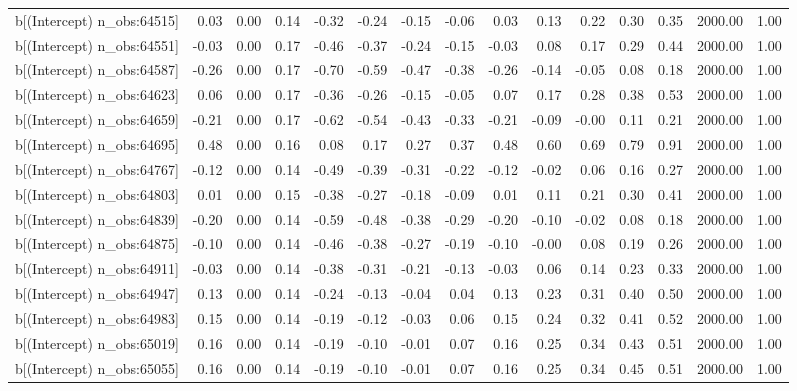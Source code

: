 \begin{table}[ht]
\begin{tabular}{rrrrrrrrrrrrrrr}
  b[(Intercept) n\_obs:64515] & 0.03 & 0.00 & 0.14 & -0.32 & -0.24 & -0.15 & -0.06 & 0.03 & 0.13 & 0.22 & 0.30 & 0.35 & 2000.00 & 1.00 \\ 
  b[(Intercept) n\_obs:64551] & -0.03 & 0.00 & 0.17 & -0.46 & -0.37 & -0.24 & -0.15 & -0.03 & 0.08 & 0.17 & 0.29 & 0.44 & 2000.00 & 1.00 \\ 
  b[(Intercept) n\_obs:64587] & -0.26 & 0.00 & 0.17 & -0.70 & -0.59 & -0.47 & -0.38 & -0.26 & -0.14 & -0.05 & 0.08 & 0.18 & 2000.00 & 1.00 \\ 
  b[(Intercept) n\_obs:64623] & 0.06 & 0.00 & 0.17 & -0.36 & -0.26 & -0.15 & -0.05 & 0.07 & 0.17 & 0.28 & 0.38 & 0.53 & 2000.00 & 1.00 \\ 
  b[(Intercept) n\_obs:64659] & -0.21 & 0.00 & 0.17 & -0.62 & -0.54 & -0.43 & -0.33 & -0.21 & -0.09 & -0.00 & 0.11 & 0.21 & 2000.00 & 1.00 \\ 
  b[(Intercept) n\_obs:64695] & 0.48 & 0.00 & 0.16 & 0.08 & 0.17 & 0.27 & 0.37 & 0.48 & 0.60 & 0.69 & 0.79 & 0.91 & 2000.00 & 1.00 \\ 
  b[(Intercept) n\_obs:64767] & -0.12 & 0.00 & 0.14 & -0.49 & -0.39 & -0.31 & -0.22 & -0.12 & -0.02 & 0.06 & 0.16 & 0.27 & 2000.00 & 1.00 \\ 
  b[(Intercept) n\_obs:64803] & 0.01 & 0.00 & 0.15 & -0.38 & -0.27 & -0.18 & -0.09 & 0.01 & 0.11 & 0.21 & 0.30 & 0.41 & 2000.00 & 1.00 \\ 
  b[(Intercept) n\_obs:64839] & -0.20 & 0.00 & 0.14 & -0.59 & -0.48 & -0.38 & -0.29 & -0.20 & -0.10 & -0.02 & 0.08 & 0.18 & 2000.00 & 1.00 \\ 
  b[(Intercept) n\_obs:64875] & -0.10 & 0.00 & 0.14 & -0.46 & -0.38 & -0.27 & -0.19 & -0.10 & -0.00 & 0.08 & 0.19 & 0.26 & 2000.00 & 1.00 \\ 
  b[(Intercept) n\_obs:64911] & -0.03 & 0.00 & 0.14 & -0.38 & -0.31 & -0.21 & -0.13 & -0.03 & 0.06 & 0.14 & 0.23 & 0.33 & 2000.00 & 1.00 \\ 
  b[(Intercept) n\_obs:64947] & 0.13 & 0.00 & 0.14 & -0.24 & -0.13 & -0.04 & 0.04 & 0.13 & 0.23 & 0.31 & 0.40 & 0.50 & 2000.00 & 1.00 \\ 
  b[(Intercept) n\_obs:64983] & 0.15 & 0.00 & 0.14 & -0.19 & -0.12 & -0.03 & 0.06 & 0.15 & 0.24 & 0.32 & 0.41 & 0.52 & 2000.00 & 1.00 \\ 
  b[(Intercept) n\_obs:65019] & 0.16 & 0.00 & 0.14 & -0.19 & -0.10 & -0.01 & 0.07 & 0.16 & 0.25 & 0.34 & 0.43 & 0.51 & 2000.00 & 1.00 \\ 
  b[(Intercept) n\_obs:65055] & 0.16 & 0.00 & 0.14 & -0.19 & -0.10 & -0.01 & 0.07 & 0.16 & 0.25 & 0.34 & 0.45 & 0.51 & 2000.00 & 1.00 \\ 

\end{tabular}
\end{table}
